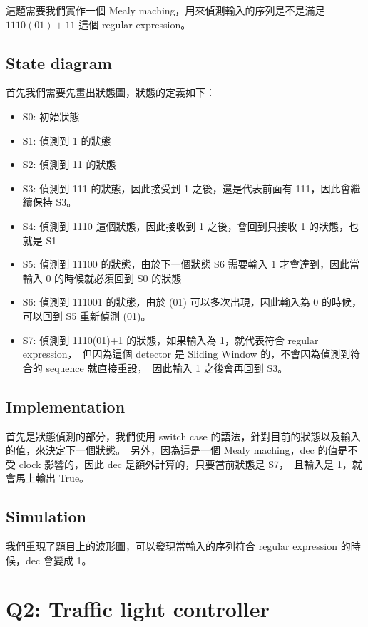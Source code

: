 \documentclass[10.5pt,compsoc,UTF8]{CjC}
\theoremstyle{mystyle}
\begin{document}
這題需要我們實作一個 Mealy maching，用來偵測輸入的序列是不是滿足 $1110(01)+11$ 這個 regular expression。

\subsection{State diagram}

首先我們需要先畫出狀態圖，狀態的定義如下：
\begin{itemize}
  \item S0: 初始狀態
  \item S1: 偵測到 1 的狀態
  \item S2: 偵測到 11 的狀態
  \item S3: 偵測到 111 的狀態，因此接受到 1 之後，還是代表前面有 111，因此會繼續保持 S3。
  \item S4: 偵測到 1110 這個狀態，因此接收到 1 之後，會回到只接收 1 的狀態，也就是 S1
  \item S5: 偵測到 11100 的狀態，由於下一個狀態 S6 需要輸入 1 才會達到，因此當輸入 0 的時候就必須回到 S0 的狀態
  \item S6: 偵測到 111001 的狀態，由於 (01) 可以多次出現，因此輸入為 0 的時候，可以回到 S5 重新偵測 (01)。
  \item S7: 偵測到 1110(01)+1 的狀態，如果輸入為 1，就代表符合 regular expression，\
            但因為這個 detector 是 Sliding Window 的，不會因為偵測到符合的 sequence 就直接重設，\
            因此輸入 1 之後會再回到 S3。
\end{itemize}

\subsection{Implementation}
首先是狀態偵測的部分，我們使用 switch case 的語法，針對目前的狀態以及輸入的值，來決定下一個狀態。\
另外，因為這是一個 Mealy maching，dec 的值是不受 clock 影響的，因此 dec 是額外計算的，只要當前狀態是 S7，\
且輸入是 1，就會馬上輸出 True。


\subsection{Simulation}
我們重現了題目上的波形圖，可以發現當輸入的序列符合 regular expression 的時候，dec 會變成 1。

\section{Q2: Traffic light controller}
\end{document}
